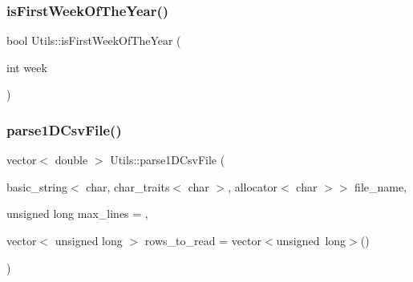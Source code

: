 \mbox{\label{classUtils_aea07106862ac4b17a93bb598952b5f3c_aea07106862ac4b17a93bb598952b5f3c}} 
\subsubsection{\texorpdfstring{is\+First\+Week\+Of\+The\+Year()}{isFirstWeekOfTheYear()}}
{\footnotesize\ttfamily bool Utils\+::is\+First\+Week\+Of\+The\+Year (\begin{DoxyParamCaption}\item[{int}]{week }\end{DoxyParamCaption})\hspace{0.3cm}{\ttfamily [static]}}

\mbox{\label{classUtils_a575cc5fb290f083a3101a8f0969ae483_a575cc5fb290f083a3101a8f0969ae483}} 
\subsubsection{\texorpdfstring{parse1\+D\+Csv\+File()}{parse1DCsvFile()}}
{\footnotesize\ttfamily vector$<$ double $>$ Utils\+::parse1\+D\+Csv\+File (\begin{DoxyParamCaption}\item[{basic\+\_\+string$<$ char, char\+\_\+traits$<$ char $>$, allocator$<$ char $>$$>$}]{file\+\_\+name,  }\item[{unsigned long}]{max\+\_\+lines = {},  }\item[{vector$<$ unsigned long $>$}]{rows\+\_\+to\+\_\+read = {\ttfamily vector$<$unsigned~long$>$()} }\end{DoxyParamCaption})\hspace{0.3cm}{\ttfamily [static]}}

\mbox{\label{classUtils_ab1dced1d690056b012aec72d28cd4176_ab1dced1d690056b012aec72d28cd4176}} 
